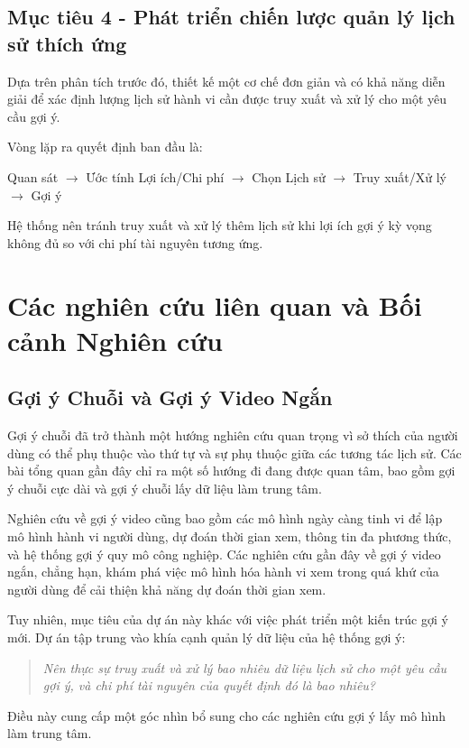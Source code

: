 \documentclass[12pt,a4paper]{article}
\begin{document}
\subsection*{Mục tiêu 4 - Phát triển chiến lược quản lý lịch sử thích ứng}
Dựa trên phân tích trước đó, thiết kế một cơ chế đơn giản và có khả năng diễn giải để xác định lượng lịch sử hành vi cần được truy xuất và xử lý cho một yêu cầu gợi ý.

Vòng lặp ra quyết định ban đầu là:
\begin{center}
Quan sát $\rightarrow$ Ước tính Lợi ích/Chi phí $\rightarrow$ Chọn Lịch sử $\rightarrow$ Truy xuất/Xử lý $\rightarrow$ Gợi ý
\end{center}

Hệ thống nên tránh truy xuất và xử lý thêm lịch sử khi lợi ích gợi ý kỳ vọng không đủ so với chi phí tài nguyên tương ứng.

\section{Các nghiên cứu liên quan và Bối cảnh Nghiên cứu}

\subsection{Gợi ý Chuỗi và Gợi ý Video Ngắn}
Gợi ý chuỗi đã trở thành một hướng nghiên cứu quan trọng vì sở thích của người dùng có thể phụ thuộc vào thứ tự và sự phụ thuộc giữa các tương tác lịch sử. Các bài tổng quan gần đây chỉ ra một số hướng đi đang được quan tâm, bao gồm gợi ý chuỗi cực dài và gợi ý chuỗi lấy dữ liệu làm trung tâm.

Nghiên cứu về gợi ý video cũng bao gồm các mô hình ngày càng tinh vi để lập mô hình hành vi người dùng, dự đoán thời gian xem, thông tin đa phương thức, và hệ thống gợi ý quy mô công nghiệp. Các nghiên cứu gần đây về gợi ý video ngắn, chẳng hạn, khám phá việc mô hình hóa hành vi xem trong quá khứ của người dùng để cải thiện khả năng dự đoán thời gian xem.

Tuy nhiên, mục tiêu của dự án này khác với việc phát triển một kiến trúc gợi ý mới. Dự án tập trung vào khía cạnh quản lý dữ liệu của hệ thống gợi ý:
\begin{quote}
\textit{Nên thực sự truy xuất và xử lý bao nhiêu dữ liệu lịch sử cho một yêu cầu gợi ý, và chi phí tài nguyên của quyết định đó là bao nhiêu?}
\end{quote}
Điều này cung cấp một góc nhìn bổ sung cho các nghiên cứu gợi ý lấy mô hình làm trung tâm.
\end{document}
